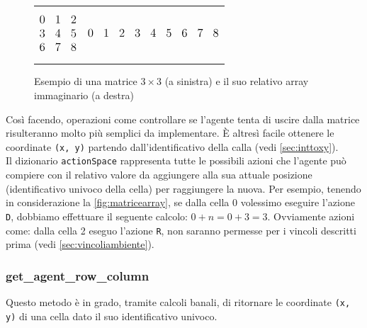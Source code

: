 \begin{figure}[H]
\begin{tabular}{m{20em} m{20em}}
	\begin{equation*}
		\large
		\begin{matrix}
			0 & 1 & 2\\
			3 & 4 & 5\\
			6 & 7 & 8 \\
		\end{matrix}
	\end{equation*}
	&
	\begin{equation*}
		\large
		\begin{matrix}
			0 & 1 & 2 & 3 & 4 & 5 & 6 & 7 & 8 \\
		\end{matrix}
	\end{equation*}
\end{tabular}
\caption{Esempio di una matrice $3 \times 3$ (a sinistra) e il suo relativo array immaginario (a destra)}
\label{fig:matricearray}
\end{figure}

Cos\`{i} facendo, operazioni come controllare se l'agente tenta di uscire dalla matrice risulteranno molto pi\`{u} semplici da implementare. \`{E} altres\`{i} facile ottenere le coordinate \lstinline[style=cmd]|(x, y)| partendo dall'identificativo della calla (vedi \autoref{sec:inttoxy}).\\

Il dizionario \lstinline[style=cmd]|actionSpace| rappresenta tutte le possibili azioni che l'agente pu\`{o} compiere con il relativo valore da aggiungere alla sua attuale posizione (identificativo univoco della cella) per raggiungere la nuova. Per esempio, tenendo in considerazione la \autoref{fig:matricearray}, se dalla cella 0 volessimo eseguire l'azione \lstinline[style=cmd]|D|, dobbiamo effettuare il seguente calcolo: $0 + n = 0 + 3 = 3$. Ovviamente azioni come: dalla cella 2 eseguo l'azione \lstinline[style=cmd]|R|, non saranno permesse per i vincoli descritti prima (vedi \autoref{sec:vincoliambiente}).

\subsubsection{get\_agent\_row\_column}
\label{sec:inttoxy}

Questo metodo \`{e} in grado, tramite calcoli banali, di ritornare le coordinate \lstinline[style=cmd]|(x, y)| di una cella dato il suo identificativo univoco.\\

